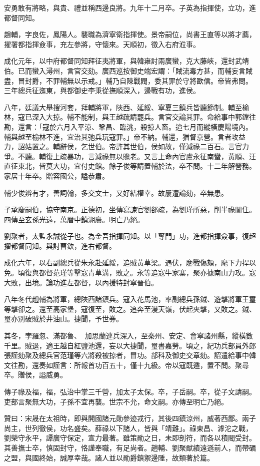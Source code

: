 \begin{pinyinscope}
安勇敢有將略，與貴、禮並稱西邊良將。九年十二月卒。子英為指揮使，立功，進都督同知。

趙輔，字良佐，鳳陽人。襲職為濟寧衛指揮使。景帝嗣位，尚書王直等以將才薦，擢署都指揮僉事，充左參將，守懷來。天順初，徵入右府涖事。

成化元年，以中府都督同知拜征夷將軍，與韓雍討兩廣蠻，克大藤峽，還封武靖伯。已而蠻入潯州，言官交劾。廣西巡按御史端宏謂：「賊流毒方甚，而輔妄言賊盡，冒封爵，不罪輔無以示戒。」輔乃自陳戰閥，委其罪於守將歐信。帝皆弗問。三年總兵征迤東，與都御史李秉從撫順深入，邊戰有功，進侯。

八年，廷議大舉搜河套，拜輔將軍，陜西、延綏、寧夏三鎮兵皆聽節制。輔至榆林，寇已深入大掠。輔不能制，與王越疏請罷兵。言官交論其罪。命給事中郭鏜往勘，還言：「寇於六月入平涼、鞏昌、臨洮，殺掠人畜。迨七月而縱橫慶陽境內。輔與越至榆林不進，宜治其弛兵玩寇罪。」帝不納。輔還，猶督京營。言者攻益力，詔姑置之。輔辭侯，乞世伯。帝許其世伯，侯如故，僅減祿二百石。言官力爭。不聽。輔復上疏暴功，言減祿無以贍老。又言上命內官盧永征南蠻，黃順、汪直征東北，皆莫大功，宜付史館。餘子俊等請置輔於法，卒不問。十二年解營務。家居十年卒。贈容國公，謚恭肅。

輔少俊辨有才，善詞翰，多交文士，又好結權幸。故屢遭論劾，卒無患。

子承慶嗣伯，協守南京。正德初，坐傳寫諫官劉郤疏，為劉瑾所惡，削半祿閒住。四傳至玄孫光遠，萬曆中鎮湖廣。明亡乃絕。

劉聚者，太監永誠從子也。為金吾指揮同知。以「奪門」功，進都指揮僉事，復超擢都督同知。與討曹欽，進右都督。

成化六年，以右副總兵從朱永赴延綏，追賊黃草梁。遇伏，鏖戰傷頦，麾下力捍以免。頃復與都督范瑾等擊寇青草溝，敗之。永等追寇牛家寨，聚亦據南山力攻。寇大敗，出境。論功進左都督，以內援特封寧晉伯。

八年冬代趙輔為將軍，總陜西諸鎮兵。寇入花馬池，率副總兵孫鉞、遊擊將軍王璽等擊卻之。還至高家堡，寇復至，敗之。追奔至漫天嶺，伏起夾擊，又敗之。鉞、璽亦別破賊於井油山。捷聞，予世券。

其冬，孛羅忽、滿都魯、加思蘭連兵深入，至秦州、安定、會寧諸州縣，縱橫數千里。賊退，適王越自紅鹽池還，妄以大捷聞，璽書嘉勞。頃之，紀功兵部員外郎張謹劾聚及總兵官范瑾等六將殺被掠者，冒功。部科及御史交章劾。詔遣給事中韓文往勘，還奏如謹言：所報首功百五十，僅十九級。帝以寇既遁，置不問。聚尋卒。贈侯，謚威勇。

傳子祿及福，福，弘治中掌三千營，加太子太保。卒，子岳嗣。卒，從子文請嗣。吏部言聚無大功，子孫不宜再襲。世宗不允，命文嗣。亦傳至明亡乃絕。

贊曰：宋晟在太祖時，即與開國諸元勛參迹戎行，其後四鎮涼州，威著西鄙。兩子尚主，世列徹侯，功名盛矣。薛祿以下諸人，皆與「靖難」。祿東昌、滹沱之戰，劉榮守永平，譚廣守保定，宣力最著。雖策勛之日，未即剖符，而各以積閥受封。其善撫士卒，慎固封守，恪謹奉職，有足尚者。趙輔、劉聚猷績遠遜前人，而帶礪之盟，與國終始，誠厚幸哉。諸人並以勛爵鎮禦邊陲，故類著於篇。


\end{pinyinscope}